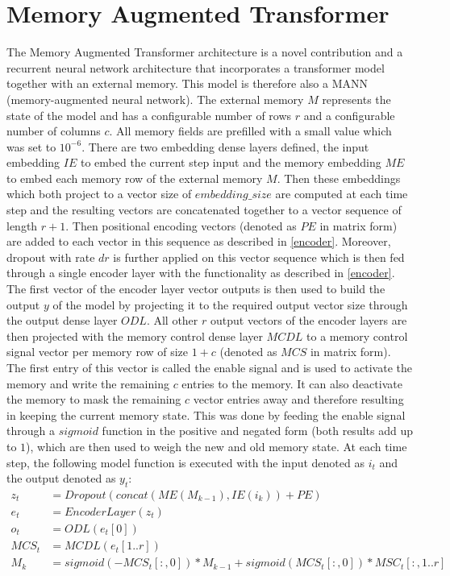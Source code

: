 \documentclass[draft,final]{vutinfth} %
\begin{document}
    \section{Memory Augmented Transformer} \label{mat}
    The Memory Augmented Transformer architecture is a novel contribution and a recurrent neural network architecture that incorporates a transformer model together with an external memory.
    This model is therefore also a MANN (memory-augmented neural network).
    The external memory $M$ represents the state of the model and has a configurable number of rows $r$ and a configurable number of columns $c$.
    All memory fields are prefilled with a small value which was set to $10^{-6}$.
    There are two embedding dense layers defined, the input embedding $IE$ to embed the current step input and the memory embedding $ME$ to embed each memory row of the external memory $M$.
    Then these embeddings which both project to a vector size of $embedding\_size$ are computed at each time step and the resulting vectors are concatenated together to a vector sequence of length $r+1$.
    Then positional encoding vectors (denoted as $PE$ in matrix form) are added to each vector in this sequence as described in \ref{encoder}.
    Moreover, dropout with rate $dr$ is further applied on this vector sequence which is then fed through a single encoder layer with the functionality as described in \ref{encoder}.
    The first vector of the encoder layer vector outputs is then used to build the output $y$ of the model by projecting it to the required output vector size through the output dense layer $ODL$.
    All other $r$ output vectors of the encoder layers are then projected with the memory control dense layer $MCDL$ to a memory control signal vector per memory row of size $1 + c$ (denoted as $MCS$ in matrix form).
    The first entry of this vector is called the enable signal and is used to activate the memory and write the remaining $c$ entries to the memory.
    It can also deactivate the memory to mask the remaining $c$ vector entries away and therefore resulting in keeping the current memory state.
    This was done by feeding the enable signal through a $sigmoid$ function in the positive and negated form (both results add up to $1$), which are then used to weigh the new and old memory state.
    At each time step, the following model function is executed with the input denoted as $i_t$ and the output denoted as $y_t$:
    \begin{align}
    z_t &= Dropout(concat(ME(M_{k-1}), IE(i_k)) + PE) \\
    e_t &= EncoderLayer(z_t) \\
    o_t &= ODL(e_t[0]) \\
    MCS_t &= MCDL(e_t[1..r]) \\
    M_k &= sigmoid(-MCS_t[:,0]) * M_{k-1} + sigmoid(MCS_t[:,0]) * MSC_t[:,1..r]
    \end{align}
\end{document}
